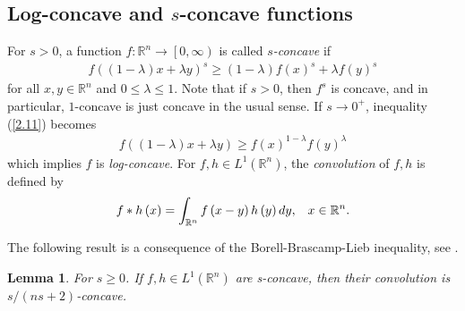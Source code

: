\documentclass[preprint,12pt]{elsarticle}
\newtheorem{lem}{Lemma}
\begin{document}
\subsection{Log-concave and $s$-concave functions}
For $s>0$, a function $f:\mathbb{R}^n\to \left [ 0,\infty  \right )$ is called {\it $s$-concave} if
\begin{eqnarray}\label{2.11}
f\left ( \left ( 1-\lambda  \right )x+\lambda y  \right )^{s }\ge  \left ( 1-\lambda  \right )f\left ( x \right )^{s}+\lambda f\left ( y \right )^{s}  
\end{eqnarray}
for all $x,y\in \mathbb{R}^n $ and $0\le \lambda \le 1  $. Note that if $s> 0$, then $f^{s} $ is concave, and in particular, $1$-concave is just concave in the usual sense. If $s\rightarrow 0^+$, inequality (\ref{2.11}) becomes 
\begin{eqnarray}
f\left ( \left ( 1-\lambda  \right )x+\lambda y  \right )\ge f\left ( x \right )^{1-\lambda } f\left ( y \right )^{\lambda }  
\end{eqnarray}
which implies $f$ is {\it log-concave}.
For $f,h\in L^{1}\left ( \mathbb{R}^n  \right )$, the {\it convolution} of $f,h$ is defined by
\begin{eqnarray}
f\ast h\left ( x \right )=\int_{\mathbb{R}^n }f\left ( x-y \right )h\left ( y \right )dy  ,\;\;\; x\in \mathbb{R}^n.\notag		
\end{eqnarray}

The following result is a consequence of the Borell-Brascamp-Lieb inequality, see \cite[Theorem 11.3]{Gardner}.
\begin{lem}\label{2aa}
For $s\ge 0 $. If $ f,h\in L^{1}\left ( \mathbb{R}^n  \right ) $ are s-concave, then their convolution is $s/ (ns+2) $-concave.
\end{lem}
\end{document}
